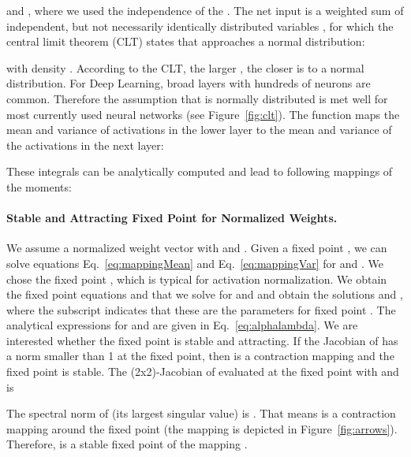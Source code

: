 \documentclass{article}
\begin{document}
and 
,
where we used the independence of the .
The net input  is a weighted sum of independent, 
but not necessarily identically distributed variables ,
for which the central limit theorem (CLT) states that  approaches a normal distribution:
 
with density . 
According to the CLT, the larger , the closer is  to a normal distribution.
For Deep Learning, broad layers with hundreds of neurons  are common. 
Therefore the assumption that  is normally distributed is met well for most currently used
neural networks (see Figure~\ref{fig:clt}).
The function  maps the mean and variance of activations in the lower layer to the mean
 and variance  of the activations  in the next layer:

These integrals can be analytically computed and lead to following 
mappings of the moments: 



\paragraph{Stable and Attracting Fixed Point  for Normalized Weights.}
\label{sec:perfect}

We assume a normalized weight
vector  with  and . 
Given a fixed point ,
we can solve equations Eq.~\eqref{eq:mappingMean} and Eq.~\eqref{eq:mappingVar} for   and
. 
We chose the fixed point ,
which is typical for activation normalization.
We obtain the fixed point equations  and  that we solve  for   and  and obtain the solutions   and ,
where the subscript  indicates that these are the parameters for fixed point .
The analytical expressions for  and  are given in Eq.~\eqref{eq:alphalambda}.  We are interested whether the fixed point  is stable
and attracting. If the Jacobian of  has a norm smaller than 1 at the
fixed point, then  is a contraction mapping and the fixed point is stable.
The (2x2)-Jacobian  of  evaluated at the fixed point  with  and 
 is 


The spectral norm of  (its largest
singular value) is . That means  is a contraction
mapping around the fixed point  (the mapping is depicted in Figure~\ref{fig:arrows}).
Therefore,  is a stable fixed point of
the mapping .
\end{document}
